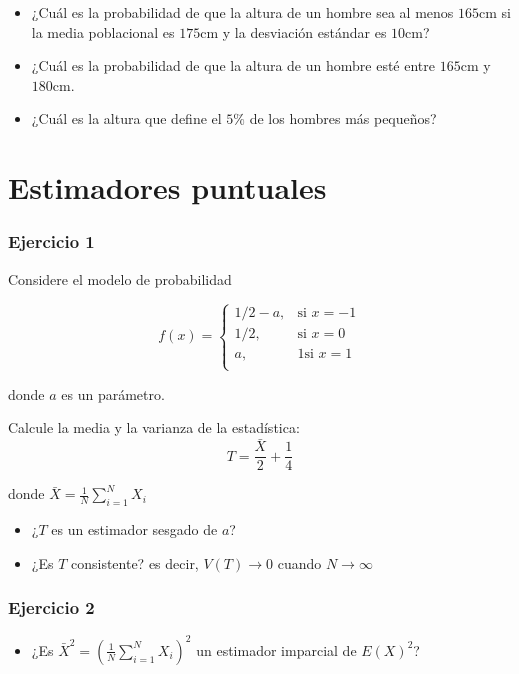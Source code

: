 \documentclass[
]{book}
\providecommand{\tightlist}{%
  \setlength{\itemsep}{0pt}\setlength{\parskip}{0pt}}
\begin{document}
\begin{itemize}
\item
  ¿Cuál es la probabilidad de que la altura de un hombre sea al menos
  \(165\)cm si la media poblacional es \(175\)cm y la desviación estándar es \(10\)cm?
\item
  ¿Cuál es la probabilidad de que la altura de un hombre esté entre
  \(165\)cm y \(180\)cm.
\item
  ¿Cuál es la altura que define el \(5\%\) de los hombres más pequeños?
\end{itemize}

\hypertarget{estimadores-puntuales}{%
\section{Estimadores puntuales}\label{estimadores-puntuales}}

\hypertarget{ejercicio-1-5}{%
\subsubsection{Ejercicio 1}\label{ejercicio-1-5}}

Considere el modelo de probabilidad

\[
    f(x)= 
\begin{cases}
    1/2-a,& \text{si } x=-1 \\ 
    1/2,& \text{si } x=0\\
    a,& 1 \text{si } x=1\\ 
\end{cases}
\]

donde \(a\) es un parámetro.

Calcule la media y la varianza de la estadística: \[T=\frac{\bar{X}}{2}+\frac{1}{4}\]

donde \(\bar{X}=\frac{1}{N}\sum_{i=1}^N X_i\)

\begin{itemize}
\item
  ¿\(T\) es un estimador sesgado de \(a\)?
\item
  ¿Es \(T\) consistente? es decir, \(V(T) \rightarrow 0\) cuando \(N\rightarrow \infty\)
\end{itemize}

\hypertarget{ejercicio-2-5}{%
\subsubsection{Ejercicio 2}\label{ejercicio-2-5}}

\begin{itemize}
\tightlist
\item
  ¿Es \(\bar{X}^2=(\frac{1}{N}\sum_{i=1}^N X_i)^2\) un estimador imparcial de \(E(X)^2\)?
\end{itemize}
\end{document}
